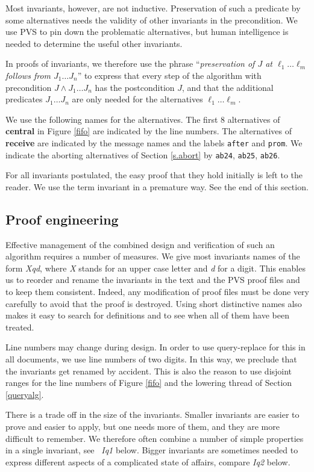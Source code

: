 \documentclass[10pt]{article} \usepackage[english]{babel}
\def\S #1/{\mbox {\textsl{#1}}}
\def\B #1/{\mbox {\textbf{#1}}}
\def\T #1/{\mbox {\texttt{#1}}}
\begin{document}
Most invariants, however, are not inductive.  Preservation of such a
predicate by some alternatives needs the validity of other invariants
in the precondition. We use PVS to pin down the problematic
alternatives, but human intelligence is needed to determine the useful
other invariants.

In proofs of invariants, we therefore use the phrase
``\emph{preservation of $J$ at $\ell_1\dots \ell_m$ follows from
  $J_1\dots J_n$}'' to express that every step of the algorithm with
precondition $J\land J_1\dots J_n$ has the postcondition $J$, and that
the additional predicates $J_1\dots J_n$ are only needed for the
alternatives $\ell_1\dots \ell_m$.

We use the following names for the alternatives.  The first 8
alternatives of \B central/ in Figure \ref{fifo} are indicated by the
line numbers. The alternatives of \B receive/ are indicated by the
message names and the labels \T after/ and \T prom/. We indicate the
aborting alternatives of Section \ref{s.abort} by \T ab24/, \T ab25/,
\T ab26/.

For all invariants postulated, the easy proof that they hold initially
is left to the reader. We use the term invariant in a premature
way.  See the end of this section.  

\subsection{Proof engineering} \label{peculiarity}

Effective management of the combined design and verification of such
an algorithm requires a number of measures.  We give most invariants
names of the form \S Xqd/, where \S X/ stands for an upper case letter
and \S d/ for a digit. This enables us to reorder and rename the
invariants in the text and the PVS proof files and to keep them
consistent.  Indeed, any modification of proof files must be done very
carefully to avoid that the proof is destroyed.  Using short
distinctive names also makes it easy to search for definitions and to
see when all of them have been treated.

Line numbers may change during design.  In order to use query-replace
for this in all documents, we use line numbers of two digits.  In this
way, we preclude that the invariants get renamed by accident.  This is
also the reason to use disjoint ranges for the line numbers of Figure
\ref{fifo} and the lowering thread of Section \ref{queryalg}.

There is a trade off in the size of the invariants.  Smaller
invariants are easier to prove and easier to apply, but one needs more
of them, and they are more difficult to remember.  We therefore often
combine a number of simple properties in a single invariant, see \S
Iq1/ below.  Bigger invariants are sometimes needed to express
different aspects of a complicated state of affairs, compare \S Iq2/
below.
\end{document}
